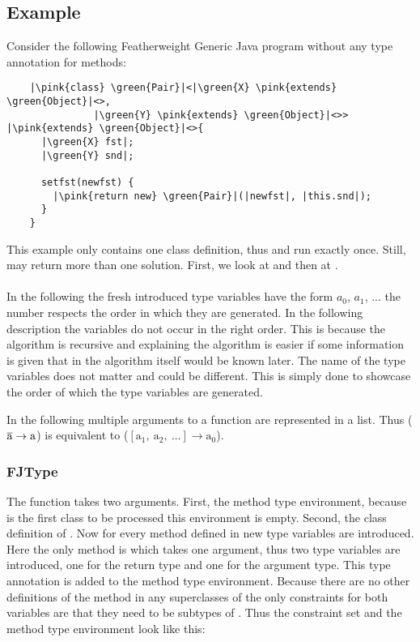 \subsection{Example}

Consider the following Featherweight Generic Java program without any type annotation for methods:

\begin{verbatim}
    |\pink{class} \green{Pair}|<|\green{X} \pink{extends} \green{Object}|<>,
               |\green{Y} \pink{extends} \green{Object}|<>> |\pink{extends} \green{Object}|<>{
      |\green{X} fst|;
      |\green{Y} snd|;

      setfst(newfst) {
        |\pink{return new} \green{Pair}|(|newfst|, |this.snd|);
      }
    }
\end{verbatim}

This example only contains one class definition, thus  and  run exactly once. Still,  may return more than one solution.
First, we look at  and then at .
\\
\\
In the following the fresh introduced type variables have the form $a_0$, $a_1$, ... the number respects the order in which they are generated. In the following description the variables do not occur in the right order. This is because the algorithm is recursive and explaining the algorithm is easier
if some information is given that in the algorithm itself would be known later. The name of the type variables does not matter and could be different. This is simply done to showcase the order of which the type variables are generated.

In the following multiple arguments to a function are represented in a list. Thus ($\overline{\text{a}} \to \text{a}$) is equivalent to ($[\text{a}_1, \ \text{a}_2, \ ...] \to \text{a}_0$).

\subsubsection{FJType}
The function  takes two arguments. First, the method type environment, because  is the first class to be processed this environment is empty. Second, the class definition of .
Now for every method defined in  new type variables are introduced. Here the only method is  which takes one argument, thus two type variables are introduced, one for the return type and one for the argument type. This type annotation is added to the method type environment.
Because there are no other definitions of the method  in any superclasses of  the only constraints for both variables are that they need to be subtypes of . Thus the constraint set and the method type environment look like this:

